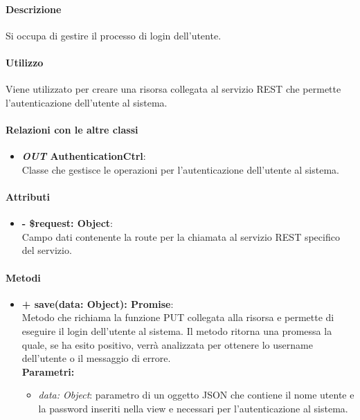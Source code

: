 	\paragraph{Descrizione}
	Si occupa di gestire il processo di login dell'utente.
	
	\paragraph{Utilizzo}
	Viene utilizzato per creare una risorsa collegata al servizio REST che permette l'autenticazione dell'utente al sistema.
	
	\paragraph{Relazioni con le altre classi}
	\begin{itemize}
		\item \textbf{\textit{OUT} AuthenticationCtrl}:\\
		Classe che gestisce le operazioni per l'autenticazione dell'utente al sistema.
	\end{itemize}
	
	\paragraph{Attributi}
	\begin{itemize}
		\item \textbf{- \$request: Object}:\\
			Campo dati contenente la route per la chiamata al servizio REST specifico del servizio.
	\end{itemize}	
	
	\paragraph{Metodi}
	\begin{itemize}
		\item \textbf{+ save(data: Object): Promise}:\\
			Metodo che richiama la funzione PUT collegata alla risorsa e permette di eseguire il login dell'utente al sistema. Il metodo ritorna una promessa la quale, se ha esito positivo, verrà analizzata per ottenere lo username dell'utente o il messaggio di errore. \\
			\textbf{Parametri:}\\
			\begin{itemize}
				\item \textit{data: Object}: parametro di un oggetto JSON che contiene il nome utente e la password inseriti nella view e necessari per l'autenticazione al sistema.
			\end{itemize}
	\end{itemize}
	
